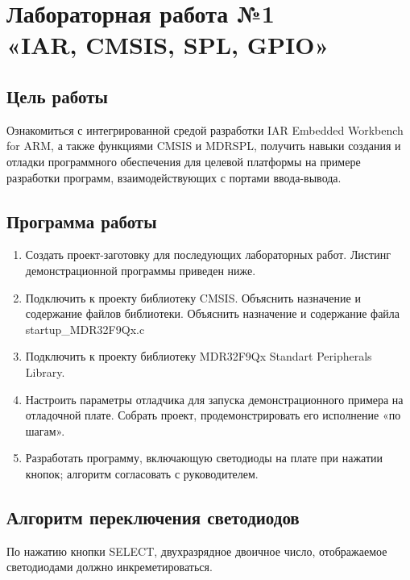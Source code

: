 \documentclass[14pt,a4paper,report]{report}
\begin{document}
\chapter {Лабораторная работа №1 \\«IAR, CMSIS, SPL, GPIO»}

\section {Цель работы}

Ознакомиться с интегрированной средой разработки IAR Embedded Workbench for ARM, а также функциями CMSIS и MDRSPL, получить навыки создания и отладки программного обеспечения для целевой платформы на примере разработки программ, взаимодействующих с портами ввода-вывода.

\section{Программа работы}

\begin{enumerate}
	\item Создать проект-заготовку для последующих лабораторных работ. Листинг демонстрационной программы приведен ниже.
	\item Подключить к проекту библиотеку CMSIS. Объяснить назначение и содержание файлов библиотеки. Объяснить назначение и содержание файла startup\_MDR32F9Qx.c
	\item Подключить к проекту библиотеку MDR32F9Qx Standart Peripherals Library.
	\item Настроить параметры отладчика для запуска демонстрационного примера на отладочной плате. Собрать проект, продемонстрировать его исполнение «по шагам».
	\item Разработать программу, включающую светодиоды на плате при нажатии кнопок; алгоритм согласовать с руководителем.
\end{enumerate}


%

\section{Алгоритм переключения светодиодов}

По нажатию кнопки SELECT, двухразрядное двоичное число, отображаемое светодиодами должно инкреметироваться. 
\end{document}
